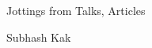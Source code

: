 \begin{frame}[fragile]\frametitle{}
\begin{center}
{\Large Jottings from Talks, Articles}

{\small Subhash Kak}


\end{center}
\end{frame}


